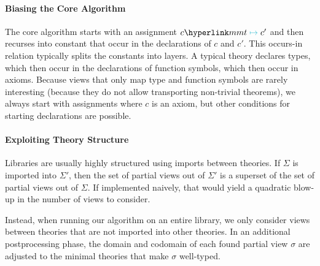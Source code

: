 \paragraph{Biasing the Core Algorithm}
The core algorithm starts with an assignment $c\mmtass c'$ and then recurses into constant that occur in the declarations of $c$ and $c'$.
This occurs-in relation typically splits the constants into layers.
A typical theory declares types, which then occur in the declarations of function symbols, which then occur in axioms.
Because views that only map type and function symbols are rarely interesting (because they do not allow transporting non-trivial theorems), we always start with assignments where $c$ is an axiom, but other conditions for starting declarations are possible.


\paragraph{Exploiting Theory Structure}
Libraries are usually highly structured using imports between theories.
If $\Sigma$ is imported into $\Sigma'$, then the set of partial views out of $\Sigma'$ is a superset of the set of partial views out of $\Sigma$.
If implemented naively, that would yield a quadratic blow-up in the number of views to consider.

Instead, when running our algorithm on an entire library, we only consider views between theories that are not imported into other theories.
In an additional postprocessing phase, the domain and codomain of each found partial view $\sigma$ are adjusted to the minimal theories that make $\sigma$ well-typed.

